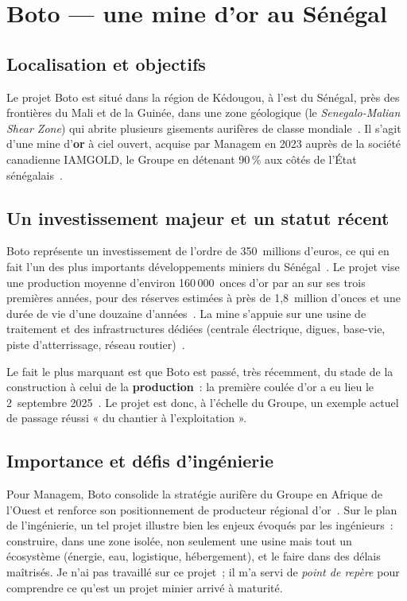 \documentclass[12pt,a4paper,oneside]{report}
\begin{document}
\section{Boto --- une mine d'or au Sénégal}

\subsection{Localisation et objectifs}

Le projet Boto est situé dans la région de Kédougou, à l'est du Sénégal, près des frontières du Mali et de la Guinée, dans une zone géologique (le \textit{Senegalo-Malian Shear Zone}) qui abrite plusieurs gisements aurifères de classe mondiale~\cite{managem_boto}. Il s'agit d'une mine d'\textbf{or} à ciel ouvert, acquise par Managem en 2023 auprès de la société canadienne IAMGOLD, le Groupe en détenant 90\,\% aux côtés de l'État sénégalais~\cite{allafrica_boto}.

\subsection{Un investissement majeur et un statut récent}

Boto représente un investissement de l'ordre de 350~millions d'euros, ce qui en fait l'un des plus importants développements miniers du Sénégal~\cite{managem_boto,northafrica_boto}. Le projet vise une production moyenne d'environ 160\,000~onces d'or par an sur ses trois premières années, pour des réserves estimées à près de 1,8~million d'onces et une durée de vie d'une douzaine d'années~\cite{managem_boto}. La mine s'appuie sur une usine de traitement et des infrastructures dédiées (centrale électrique, digues, base-vie, piste d'atterrissage, réseau routier)~\cite{northafrica_boto}.

Le fait le plus marquant est que Boto est passé, très récemment, du stade de la construction à celui de la \textbf{production}~: la première coulée d'or a eu lieu le 2~septembre 2025~\cite{managem_boto}. Le projet est donc, à l'échelle du Groupe, un exemple actuel de passage réussi « du chantier à l'exploitation ».

\subsection{Importance et défis d'ingénierie}

Pour Managem, Boto consolide la stratégie aurifère du Groupe en Afrique de l'Ouest et renforce son positionnement de producteur régional d'or~\cite{allafrica_boto}. Sur le plan de l'ingénierie, un tel projet illustre bien les enjeux évoqués par les ingénieurs~: construire, dans une zone isolée, non seulement une usine mais tout un écosystème (énergie, eau, logistique, hébergement), et le faire dans des délais maîtrisés. Je n'ai pas travaillé sur ce projet~; il m'a servi de \emph{point de repère} pour comprendre ce qu'est un projet minier arrivé à maturité.
\end{document}
